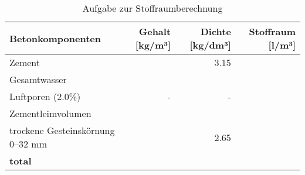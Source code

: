 \begin{questions}
    \begin{table}[h]
        \centering
        \caption{Aufgabe zur Stoffraumberechnung}
        \begin{tabular}{lrrr}
        \toprule
        \textbf{Betonkomponenten}       & \textbf{Gehalt [kg/m³]} & \textbf{Dichte [kg/dm³]} & \textbf{Stoffraum [l/m³]} \\ 
        \midrule
        Zement                           & {}                      & 3.15                       &    {}          \\
        Gesamtwasser                     & {}                      & {}                       & {}            \\
        Luftporen (2.0\%)                & -                        & -                         & {}              \\
        Zementleimvolumen                &                          &                           &                           \\
        trockene Gesteinskörnung 0–32 mm & {}                     & 2.65                       & {}             \\
        \textbf{total}                   & {}           &            {}               & {}             \\
        \bottomrule
    \end{tabular}
    \label{tab:Stoffraumberechnung2sol}
        \end{table}




        \begin{solution}

            \begin{table}[H]
                \centering
            

\end{table}
\end{solution}
\end{questions}
